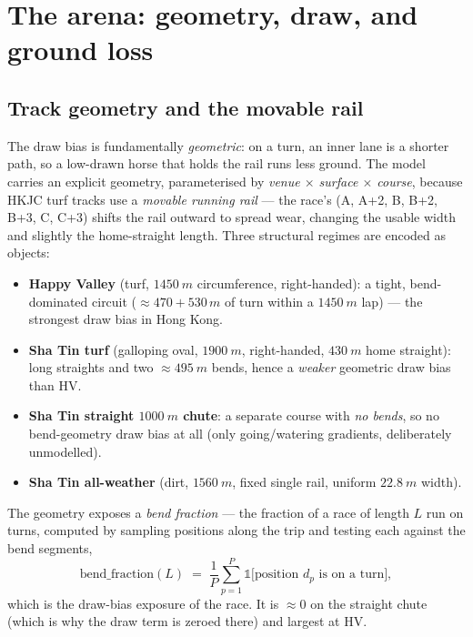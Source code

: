 \chapter{The arena: geometry, draw, and ground loss}
\label{ch:geometry}

\section{Track geometry and the movable rail}

The draw bias is fundamentally \emph{geometric}: on a turn, an inner lane is a shorter path, so a
low-drawn horse that holds the rail runs less ground. The model carries an explicit geometry,
parameterised by \emph{venue $\times$ surface $\times$ course}, because HKJC turf tracks use a
\emph{movable running rail} --- the race's  (A, A+2, B, B+2, B+3, C, C+3) shifts the
rail outward to spread wear, changing the usable width and slightly the home-straight length. Three
structural regimes are encoded as  objects:
\begin{itemize}
  \item \textbf{Happy Valley} (turf, $\SI{1450}{m}$ circumference, right-handed): a tight,
        bend-dominated circuit ($\approx 470 + 530\,\si{m}$ of turn within a $\SI{1450}{m}$ lap)
        --- the strongest draw bias in Hong Kong.
  \item \textbf{Sha Tin turf} (galloping oval, $\SI{1900}{m}$, right-handed, $\SI{430}{m}$ home
        straight): long straights and two $\approx \SI{495}{m}$ bends, hence a \emph{weaker}
        geometric draw bias than HV.
  \item \textbf{Sha Tin straight $\SI{1000}{m}$ chute}: a separate course with \emph{no bends}, so
        no bend-geometry draw bias at all (only going/watering gradients, deliberately unmodelled).
  \item \textbf{Sha Tin all-weather} (dirt, $\SI{1560}{m}$, fixed single rail, uniform
        $\SI{22.8}{m}$ width).
\end{itemize}
The geometry exposes a \emph{bend fraction} --- the fraction of a race of length $L$ run on turns,
computed by sampling positions along the trip and testing each against the bend segments,
\begin{equation}
  \mathrm{bend\_fraction}(L) \;=\; \frac{1}{P}\sum_{p=1}^{P}\mathbb{1}\bigl[\text{position } d_p
   \text{ is on a turn}\bigr],
  \label{eq:bendfrac}
\end{equation}
which is the draw-bias exposure of the race. It is $\approx 0$ on the straight chute (which is why
the draw term is zeroed there) and largest at HV.

